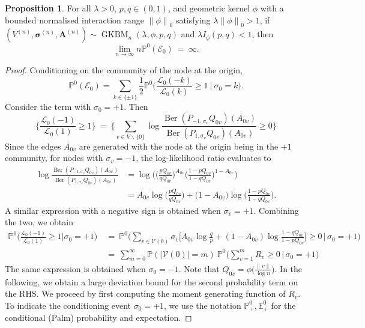 \documentclass[letterpaper,11pt]{article}
\newtheorem{prop}[thm]{Proposition}
\theoremstyle{definition}
\def\E{\mathbb{E}}
\def\P{\mathbb{P}}
\def\bA{\bm{A}}
\newcommand{\bsigma}{\bm{\sigma}}
\def\cE{\mathcal{E}}
\def\cL{\mathcal{L}}
\def\cV{\mathcal{V}}
\def\weq{ \ = \ }
\newcommand{\Ber}{\operatorname{Ber}}
\newcommand{\zeronorm}[1]{{\lVert#1\rVert}_0}
\numberwithin{equation}{section}
\newcommand{\GKBM}{\operatorname{GKBM}}
\newcommand{\la}{\lambda}
\newtheorem{prop}[thm]{Proposition}
\theoremstyle{definition}
\def\E{\mathbb{E}}
\def\P{\mathbb{P}}
\def\bA{\bm{A}}
\newcommand{\bsigma}{\bm{\sigma}}
\def\cE{\mathcal{E}}
\def\cL{\mathcal{L}}
\def\cV{\mathcal{V}}
\def\weq{ \ = \ }
\newcommand{\Ber}{\operatorname{Ber}}
\newcommand{\zeronorm}[1]{{\lVert#1\rVert}_0}
\numberwithin{equation}{section}
\newcommand{\GKBM}{\operatorname{GKBM}}
\newcommand{\la}{\lambda}
\theoremstyle{thmstyletwo}%
\begin{document}
\begin{prop}
\label{prop:origin_bad}
For all $\la >0$, $p,q \in(0,1)$, and geometric kernel $\phi$
with a bounded normalised interaction range $\zeronorm{\phi}$ satisfying $\la \zeronorm{\phi} >1$,  if $(V^{(n)}, \bsigma^{(n)}, \bA^{(n)}) \sim \GKBM_n(\la, \phi, p, q)$ and $\la I_{\phi}(p,q) <1$, then
\[
\lim_{n \to \infty}  n \P^0(\cE_0)
\weq \infty.
\]
\end{prop}
\begin{proof}
Conditioning on the community of the node at the origin,
\begin{equation}
\P^0(\cE_0)
= \sum_{k \in \{\pm 1\}} \frac12 \P^0\bigg(\frac{\cL_0(-k)}{\cL_0(k)} \ge 1\ \Big|\  \sigma_0 = k\bigg).
\label{eq:origin_bad}
\end{equation}
Consider the term with $\sigma_0 = +1$. Then
\[
\bigg\{\frac{\cL_0(-1)}{\cL_0(1)} \ge 1 \bigg\} \weq \bigg\{\sum_{v\in V\backslash \{0 \}} \log \frac{\Ber(P_{-1, \sigma_v}Q_{0v})(A_{0v})}{\Ber(P_{1,\sigma_v}Q_{0v})(A_{0v})} \ge 0\bigg\}
\]
Since the edges $A_{0v}$ are generated with the node at the origin being in the $+1$ community, for nodes with $\sigma_v=-1$, the log-likelihood ratio evaluates to
\begin{align*}
\log \frac{\Ber(P_{-1, \sigma_v}Q_{0v})(A_{0v})}{\Ber(P_{1,\sigma_v}Q_{0v})(A_{0v})} 
&= 
\log \bigg(\Big(\frac{pQ_{0v}}{qQ_{0v}}\Big)^{A_{0v}}\Big(\frac{1-pQ_{0v}}{1-qQ_{0v}}\Big)^{1-A_{0v}}\bigg)\\
&=
A_{0v}\log \Big(\frac{pQ_{0v}}{qQ_{0v}}\Big)+ \big( 1-A_{0v} \big)\log\bigg(\frac{1-pQ_{0v}}{1-qQ_{0v}}\bigg).
\end{align*}
A similar expression with a negative sign is obtained when $\sigma_v=+1$. Combining the two, we obtain
\begin{align}
\P^0\Big( \frac{\cL_0(-1)}{\cL_0(1)} \ge 1\Big|\sigma_0=+1\Big)& \weq \P^0\Big( \sum_{v\in \cV(0)}\sigma_v\Big[A_{0v}\log\frac{q}{p}+(1-A_{0v}) \log \frac{1-qQ_{0v}}{1-pQ_{0v}}\Big]\ge 0 \,\Big|\,\sigma_0=+1\Big) \nonumber\\
&\weq \sum_{m=0}^\infty \P(|\cV(0)|=m) \ \P^0\Big( \sum_{v=1}^m R_v \ge 0 \,\Big|\,\sigma_0=+1\Big)%
\label{eq:map_Poisson_sum}
\end{align}
The same expression is obtained when $\sigma_0=-1$. Note that $Q_{0v} = \phi\Big(\frac{\|v\|}{\log n}\Big)$. In the following, we obtain a large deviation bound for the second probability term on the RHS. %
We proceed by first computing the moment generating function of $R_v$. To indicate the conditioning event $\sigma_0=+1$, we use the notation $\P^0_+, \E^0_+$ for the conditional (Palm) probability and expectation.


\end{proof}
\end{document}
